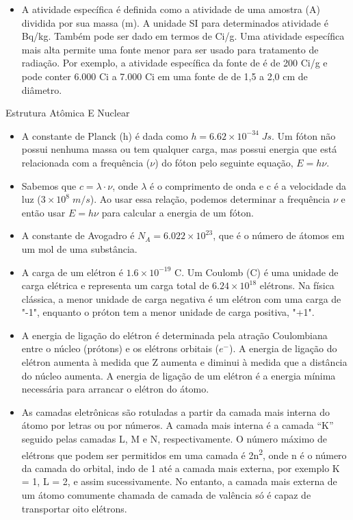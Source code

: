 \documentclass[11pt,a4paper]{article}
\newcounter{exemplo}
\begin{document}
\begin{exemplo}
\begin{itemize}
        \item A atividade específica é definida como a atividade de uma amostra (A) dividida por sua massa (m). A unidade SI para determinados atividade é Bq/kg. Também pode ser dado em termos de  Ci/g. Uma atividade específica mais alta permite uma fonte menor para ser usado para tratamento de radiação. Por exemplo, a atividade específica da fonte de  é de 200 Ci/g e pode conter 6.000 Ci a 7.000 Ci em uma fonte de  de 1,5 a 2,0 cm de diâmetro.
        
    \end{itemize}

    \textcolor{CarnationPink}{Estrutura Atômica E Nuclear}
    \begin{itemize}
        \item A constante de Planck (h) é dada como $h = 6.62 \times 10^{-34} \; J s$. Um fóton não possui nenhuma massa ou tem qualquer carga, mas possui energia que está relacionada com a frequência ($\nu$) do fóton pelo seguinte equação, $E = h\nu$.
        
        \item Sabemos que $c = \lambda \cdot \nu$, onde $\lambda$ é o comprimento de onda e c é a velocidade da luz ($3 \times 10^{8} \; m/s$). Ao usar essa relação, podemos determinar a frequência $\nu$ e então usar $E = h \nu$ para calcular a energia de um fóton.
        
        \item A constante de Avogadro é $N_A = 6.022 \times 10^{23}$, que é o número de átomos em um mol de uma substância.
        
        \item A carga de um elétron é $1.6 \times 10^{-19}$ C. Um Coulomb (C) é uma unidade de carga elétrica e representa um carga total de $6.24 \times 10^{18}$ elétrons. Na física clássica, a menor unidade de carga negativa é um elétron com
        uma carga de "-1", enquanto o próton tem a menor unidade de carga positiva, "+1".

        \item A energia de ligação do elétron é determinada pela atração Coulombiana entre o núcleo (prótons) e os elétrons orbitais ($e^{-}$). A energia de ligação do elétron aumenta à medida que Z aumenta e diminui à medida que a distância do núcleo aumenta. A energia de ligação de um elétron é a energia mínima necessária para arrancar o elétron do átomo.
        
        \item As camadas eletrônicas são rotuladas a partir da camada mais interna do átomo por letras ou por números. A camada mais interna é a camada “K” seguido pelas camadas L, M e N, respectivamente. O número máximo de elétrons que podem ser permitidos em uma camada é 2n\textsuperscript{2}, onde n é o número da camada do orbital, indo de 1 até a camada mais externa, por exemplo K = 1, L = 2, e assim sucessivamente. No entanto, a camada mais externa de um átomo comumente chamada de camada de valência só é capaz de transportar oito elétrons.
        

\end{itemize}
\end{exemplo}
\end{document}
